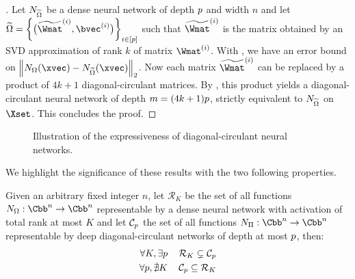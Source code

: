 \begin{proof}[]
  Let $N_{\widetilde{\Omega}}$ be a dense neural network of depth $p$ and width $n$ and let $\widetilde{\Omega} = \left\{ \big(\widetilde{\Wmat}^{(i)}, \bvec^{(i)} \big) \right\}_{i \in [\depth]}$ such that $\widetilde{\Wmat}^{(i)}$ is the matrix obtained by an SVD approximation of rank $k$ of matrix $\Wmat^{(i)}$.
  With , we have an error bound on $\norm{ \nn_\Omega (\xvec) - \nn_{\widetilde{\Omega}} (\xvec)}_2$.
  Now each matrix $\widetilde{\Wmat}^{(i)}$ can be replaced by a product of $4k+1$ diagonal-circulant matrices.
  By , this product yields a diagonal-circulant neural network of depth $m = (4k+1)p$, strictly equivalent to $N_{\widetilde{\Omega}}$ on $\Xset$.
  This concludes the proof.
\end{proof}

\pagebreak

\begin{figure}[htb]
    \begin{center}
      
    \end{center}
    \caption{Illustration of the expressiveness of diagonal-circulant neural networks.}
    \label{figure:ch4-circfig}
\end{figure}

We highlight the significance of these results with the two following properties.
\begin{properties}
  Given an arbitrary fixed integer $n$, let $\mathcal{R}_{K}$ be the set of all functions $\nn_\Omega:\Cbb^n \rightarrow \Cbb^n$ representable by a dense neural network with \relu activation of total rank at most $K$ and let $\mathcal{C}_p$ the set of all functions $\nn_\Pi:\Cbb^n \rightarrow \Cbb^n$ representable by deep diagonal-circulant networks of depth at most $p$, then:
  \begin{align}
    \label{property:eq1} \forall K,\exists p \, &\quad \mathcal{R}_{K} \subsetneq \mathcal{C}_{p} \\
    \label{property:eq2} \forall p,\nexists K\, &\quad \mathcal{C}_{p} \subseteq \mathcal{R}_{K}
  \end{align}
  \removespace
\end{properties}

